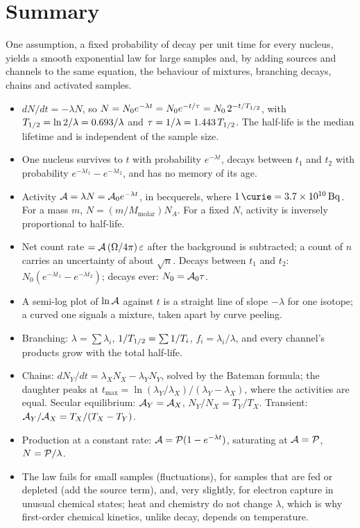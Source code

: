 \section{Summary}\label{sec:summary-decaylaw}
One assumption, a fixed probability of decay per unit time for every nucleus, yields a smooth
exponential law for large samples and, by adding sources and channels to the same equation, the
behaviour of mixtures, branching decays, chains and activated samples.

\begin{itemize}
\item $dN/dt=-\lambda N$, so $N=N_0e^{-\lambda t}=N_0e^{-t/\tau}=N_0\,2^{-t/T_{1/2}}$, with
      $T_{1/2}=\ln2/\lambda=0.693/\lambda$ and $\tau=1/\lambda=1.443\,T_{1/2}$. The half-life is the median
      lifetime and is independent of the sample size.
\item One nucleus survives to $t$ with probability $e^{-\lambda t}$, decays between $t_1$ and $t_2$ with
      probability $e^{-\lambda t_1}-e^{-\lambda t_2}$, and has no memory of its age.
\item Activity $\mathcal{A}=\lambda N=\mathcal{A}_0e^{-\lambda t}$, in becquerels, where
      $\SI{1}{\curie}=\SI{3.7e10}{\becquerel}$. For a mass $m$, $N=(m/M_\text{molar})N_A$. For a fixed $N$, activity is inversely proportional to
      half-life.
\item Net count rate $=\mathcal{A}\,(\Omega/4\pi)\,\varepsilon$ after the background is subtracted; a count of
      $n$ carries an uncertainty of about $\sqrt n$. Decays between $t_1$ and $t_2$:
      $N_0(e^{-\lambda t_1}-e^{-\lambda t_2})$; decays ever: $N_0=\mathcal{A}_0\tau$.
\item A semi-log plot of $\ln\mathcal{A}$ against $t$ is a straight line of slope $-\lambda$ for one isotope;
      a curved one signals a mixture, taken apart by curve peeling.
\item Branching: $\lambda=\sum\lambda_i$, $1/T_{1/2}=\sum 1/T_i$, $f_i=\lambda_i/\lambda$, and every
      channel's products grow with the total half-life.
\item Chains: $dN_Y/dt=\lambda_XN_X-\lambda_YN_Y$, solved by the Bateman formula; the daughter peaks at
      $t_{\max}=\ln(\lambda_Y/\lambda_X)/(\lambda_Y-\lambda_X)$, where the activities are equal. Secular
      equilibrium: $\mathcal{A}_Y=\mathcal{A}_X$, $N_Y/N_X=T_Y/T_X$. Transient: $\mathcal{A}_Y/\mathcal{A}_X=T_X/(T_X-T_Y)$.
\item Production at a constant rate: $\mathcal{A}=\mathcal{P}(1-e^{-\lambda t})$, saturating at $\mathcal{A}=\mathcal{P}$,
      $N=\mathcal{P}/\lambda$.
\item The law fails for small samples (fluctuations), for samples that are fed or depleted (add the source
      term), and, very slightly, for electron capture in unusual chemical states; heat and chemistry do not
      change $\lambda$, which is why first-order chemical kinetics, unlike decay, depends on temperature.
\end{itemize}


